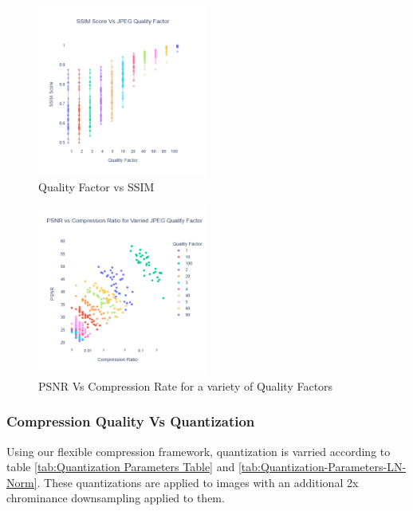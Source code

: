 \begin{figure}
    \includegraphics[width=0.5\textwidth]{assets/JPEG Quality factor and SSIM Score.png}
    \caption{Quality Factor vs SSIM}
    \label{fig:ssim_jpeg}
\end{figure}

\begin{figure}
    \includegraphics[width=0.5\textwidth]{assets/JPEG Compression Ratio Vs PSNR.png}
    \caption{PSNR Vs Compression Rate for a variety of Quality Factors}
    \label{fig:psnr_vs_compression_ratio}
\end{figure}

\subsubsection{Compression Quality Vs Quantization}

Using our flexible compression framework, quantization is varried according to table \ref{tab:Quantization Parameters Table} and \ref{tab:Quantization-Parameters-LN-Norm}. These quantizations are applied to images with an additional 2x chrominance downsampling applied to them.

